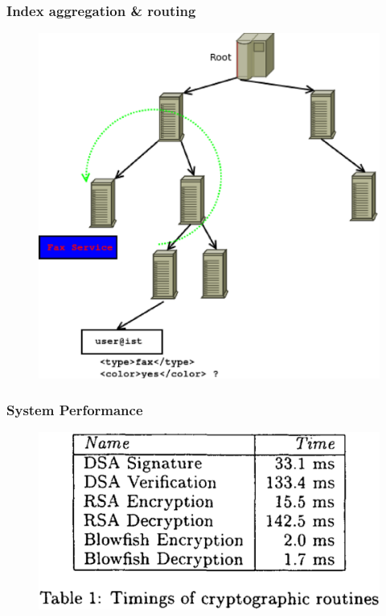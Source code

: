 \documentclass{beamer}
\begin{document}
\begin{frame}[fragile] %
\frametitle{Index aggregation \& routing}
\begin{figure}
\includegraphics[scale=0.4]{d4}
\end{figure}
\end{frame}


\begin{frame}[fragile] %
\frametitle{System Performance}
\begin{figure}
\includegraphics[scale=0.2]{t1}
\end{figure}
\end{frame}
\end{document}
